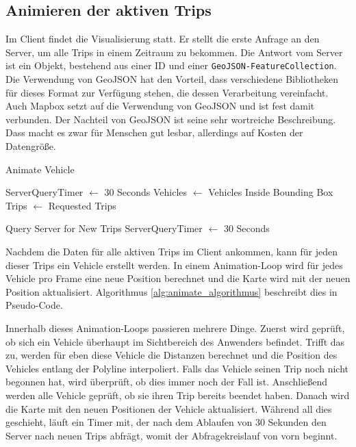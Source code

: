 \subsection{Animieren der aktiven Trips}
\label{sub:animieren_der_aktiven_trips}
  Im Client findet die Visualisierung statt. Er stellt die erste Anfrage an den Server, um alle Trips in einem Zeitraum zu bekommen. Die Antwort vom Server ist ein Objekt, bestehend aus einer ID und einer \texttt{GeoJSON-FeatureCollection}. Die Verwendung von GeoJSON hat den Vorteil, dass verschiedene Bibliotheken für dieses Format zur Verfügung stehen, die dessen Verarbeitung vereinfacht. Auch Mapbox setzt auf die Verwendung von GeoJSON und ist fest damit verbunden. Der Nachteil von GeoJSON ist seine sehr wortreiche Beschreibung. Dass macht es zwar für Menschen gut lesbar, allerdings auf Kosten der Datengröße.

  \begin{algorithm}[H]
    \caption{Animate Vehicle}\label{alg:animate_algorithmus}
    \begin{algorithmic}[1]
        \State ServerQueryTimer $\gets$ 30 Seconds
        \State Vehicles $\gets$ Vehicles Inside Bounding Box
        \State Trips $\gets$ Requested Trips
           \EndFor

            \State Query Server for New Trips
            \State ServerQueryTimer $\gets$ 30 Seconds
          \EndIf

          \State {}
        \EndFunction
    \end{algorithmic}
  \end{algorithm}

  Nachdem die Daten für alle aktiven Trips im Client ankommen, kann für jeden dieser Trips ein Vehicle erstellt werden. In einem Animation-Loop wird für jedes Vehicle pro Frame eine neue Position berechnet und die Karte wird mit der neuen Position aktualisiert. Algorithmus \ref{alg:animate_algorithmus} beschreibt dies in Pseudo-Code.

  Innerhalb dieses Animation-Loops passieren mehrere Dinge. Zuerst wird geprüft, ob sich ein Vehicle überhaupt im Sichtbereich des Anwenders befindet. Trifft das zu, werden für eben diese Vehicle die Distanzen berechnet und die Position des Vehicles entlang der Polyline interpoliert. Falls das Vehicle seinen Trip noch nicht begonnen hat, wird überprüft, ob dies immer noch der Fall ist. Anschließend werden alle Vehicle geprüft, ob sie ihren Trip bereits beendet haben. Danach wird die Karte mit den neuen Positionen der Vehicle aktualisiert. Während all dies geschieht, läuft ein Timer mit, der nach dem Ablaufen von 30 Sekunden den Server nach neuen Trips abfrägt, womit der Abfragekreislauf von vorn beginnt.

